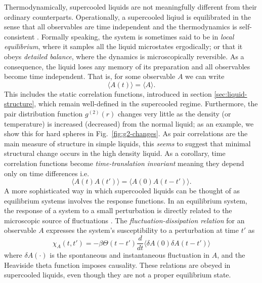 \documentclass[11pt,twoside]{report}
\begin{document}
Thermodynamically, supercooled liquids are not meaningfully different from their ordinary counterparts.
Operationally, a supercooled liqiud is equilibrated in the sense that all observables are time independent and the thermodynamics is self-consistent%
.
Formally speaking, the system is sometimes said to be in \emph{local equilibrium}, where it samples all the liquid microstates ergodically; or that it obeys \emph{detailed balance}, where the dynamics is microscopically reversible.
As a consequence, the liquid loses any memory of its preparation and all observables become time independent.
That is, for some observable $A$ we can write
\begin{equation*}
  \langle A(t) \rangle = \langle A \rangle.
\end{equation*}
This includes the static correlation functions, introduced in section \ref{sec:liquid-structure}, which remain well-defined in the supercooled regime.
Furthermore, the pair distribution function $g^{(2)}(r)$ changes very little as the density (or temperature) is increased (decreased) from the normal liquid; as an example, we show this for hard spheres in Fig.\ \ref{fig:g2-changes}.
As pair correlations are the main measure of structure in simple liquids, this \emph{seems} to suggest that minimal structural change occurs in the high density liquid.
As a corollary, time correlation functions become \emph{time-translation invariant} meaning they depend only on time differences i.e.\
\begin{equation*}
  \langle A(t) A(t') \rangle = \langle A(0) A(t - t') \rangle.
\end{equation*}
A more sophisticated way in which supercooled liquids can be thought of as equilibrium systems involves the response functions.
In an equilibrium system, the response of a system to a small perturbation is directly related to the microscopic source of fluctuations%
\marginfootnote{Temperature, in the case of liquids.}.
The \emph{fluctuation-dissipation relation} for an observable $A$ expresses the system's susceptibility to a perturbation at time $t'$ as \cite{Chandler1987}
\begin{equation*}
  \chi_A (t, t')
  =
  - \beta \Theta(t - t')
  \frac{d}{dt}
  \big\langle
  \delta A(0)
  \delta A(t - t')
  \big\rangle
\end{equation*}
where $\delta A(\cdot)$ is the spontaneous and instantaneous fluctuation in $A$, and the Heaviside theta function imposes causality.
These relations are obeyed in supercooled liquids, even though they are not a proper equilibrium state.
\end{document}
